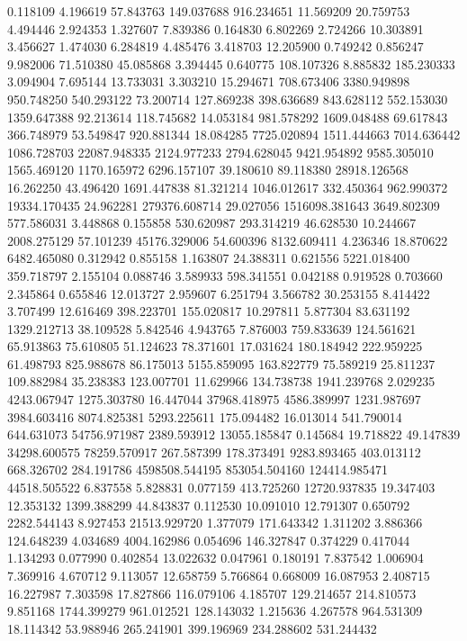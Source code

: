 0.118109
4.196619
57.843763
149.037688
916.234651
11.569209
20.759753
4.494446
2.924353
1.327607
7.839386
0.164830
6.802269
2.724266
10.303891
3.456627
1.474030
6.284819
4.485476
3.418703
12.205900
0.749242
0.856247
9.982006
71.510380
45.085868
3.394445
0.640775
108.107326
8.885832
185.230333
3.094904
7.695144
13.733031
3.303210
15.294671
708.673406
3380.949898
950.748250
540.293122
73.200714
127.869238
398.636689
843.628112
552.153030
1359.647388
92.213614
118.745682
14.053184
981.578292
1609.048488
69.617843
366.748979
53.549847
920.881344
18.084285
7725.020894
1511.444663
7014.636442
1086.728703
22087.948335
2124.977233
2794.628045
9421.954892
9585.305010
1565.469120
1170.165972
6296.157107
39.180610
89.118380
28918.126568
16.262250
43.496420
1691.447838
81.321214
1046.012617
332.450364
962.990372
19334.170435
24.962281
279376.608714
29.027056
1516098.381643
3649.802309
577.586031
3.448868
0.155858
530.620987
293.314219
46.628530
10.244667
2008.275129
57.101239
45176.329006
54.600396
8132.609411
4.236346
18.870622
6482.465080
0.312942
0.855158
1.163807
24.388311
0.621556
5221.018400
359.718797
2.155104
0.088746
3.589933
598.341551
0.042188
0.919528
0.703660
2.345864
0.655846
12.013727
2.959607
6.251794
3.566782
30.253155
8.414422
3.707499
12.616469
398.223701
155.020817
10.297811
5.877304
83.631192
1329.212713
38.109528
5.842546
4.943765
7.876003
759.833639
124.561621
65.913863
75.610805
51.124623
78.371601
17.031624
180.184942
222.959225
61.498793
825.988678
86.175013
5155.859095
163.822779
75.589219
25.811237
109.882984
35.238383
123.007701
11.629966
134.738738
1941.239768
2.029235
4243.067947
1275.303780
16.447044
37968.418975
4586.389997
1231.987697
3984.603416
8074.825381
5293.225611
175.094482
16.013014
541.790014
644.631073
54756.971987
2389.593912
13055.185847
0.145684
19.718822
49.147839
34298.600575
78259.570917
267.587399
178.373491
9283.893465
403.013112
668.326702
284.191786
4598508.544195
853054.504160
124414.985471
44518.505522
6.837558
5.828831
0.077159
413.725260
12720.937835
19.347403
12.353132
1399.388299
44.843837
0.112530
10.091010
12.791307
0.650792
2282.544143
8.927453
21513.929720
1.377079
171.643342
1.311202
3.886366
124.648239
4.034689
4004.162986
0.054696
146.327847
0.374229
0.417044
1.134293
0.077990
0.402854
13.022632
0.047961
0.180191
7.837542
1.006904
7.369916
4.670712
9.113057
12.658759
5.766864
0.668009
16.087953
2.408715
16.227987
7.303598
17.827866
116.079106
4.185707
129.214657
214.810573
9.851168
1744.399279
961.012521
128.143032
1.215636
4.267578
964.531309
18.114342
53.988946
265.241901
399.196969
234.288602
531.244432
